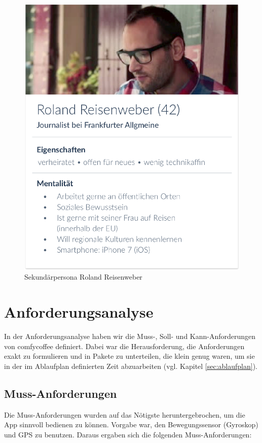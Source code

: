 \begin{figure}[H]
    \centering
		\includegraphics{Bilder/roland.eps}
		\caption{Sekundärpersona Roland Reisenweber}
\end{figure}

\section{Anforderungsanalyse}
In der Anforderungsanalyse haben wir die Muss-, Soll- und Kann-Anforderungen von comfycoffee definiert. Dabei war die Herausforderung, die Anforderungen exakt zu formulieren und in Pakete zu unterteilen, die klein genug waren, um sie in der im Ablaufplan definierten Zeit abzuarbeiten (vgl. Kapitel \ref{sec:ablaufplan}).

\subsection{Muss-Anforderungen}
\label{subsec:mussanforderungen}
Die Muss-Anforderungen wurden auf das Nötigste heruntergebrochen, um die App sinnvoll bedienen zu können. Vorgabe war, den Bewegungssensor (Gyroskop) und GPS zu benutzen. Daraus ergaben sich die folgenden Muss-Anforderungen:

